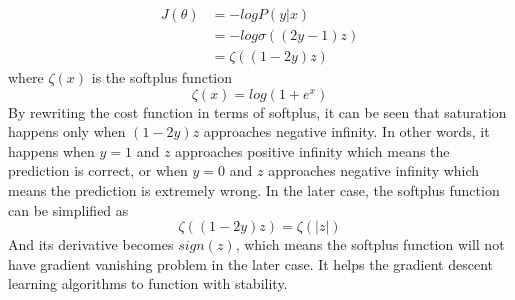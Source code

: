 \begin{equation}
    \begin{aligned}
        J(\theta) &= -logP(y|x) \\
        & = -log \sigma ((2y-1)z) \\
        & = \zeta ((1-2y)z)
    \end{aligned}
\end{equation}
%
where $\zeta(x)$ is the softplus function 
\begin{equation}
    \zeta(x) = log(1+e^x)
\end{equation}
%
By rewriting the cost function in terms of softplus, it can be seen that saturation happens only when $(1-2y)z$ approaches negative infinity.
In other words, it happens when $y=1$ and $z$ approaches positive infinity which means the prediction is correct, or when $y=0$ and $z$ approaches negative infinity which means the prediction is extremely wrong.
In the later case, the softplus function can be simplified as
\begin{equation}
    \zeta((1-2y)z) = \zeta(|z|)
\end{equation}
%
And its derivative becomes $sign(z)$, which means the softplus function will not have gradient vanishing problem in the later case.
It helps the gradient descent learning algorithms to function with stability.

